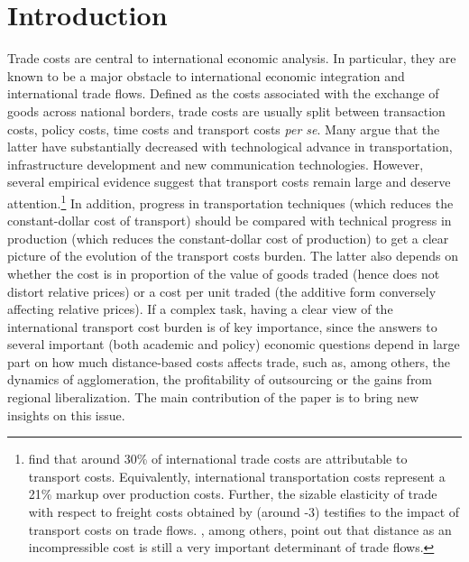 \documentclass[a4paper,11pt]{article}
\begin{document}
{\normalsize \vspace{0cm} }

{\normalsize \titlepage }

{\normalsize \newpage }


\section{Introduction \label{sec:Intro}}


Trade costs are central to international economic analysis. In particular, they are
known to be a major obstacle to international economic integration and international trade
flows. Defined as the costs associated with the exchange of goods across
national borders, trade costs are usually split between transaction costs, policy costs, time costs and transport costs \textit{per se}. Many argue that the latter have substantially
decreased with technological advance in transportation, infrastructure development
and new communication technologies. However, several empirical evidence
suggest that transport costs remain large and deserve attention.\footnote{\cite{anderson_wincoop_jel} find that around 30\% of international trade costs are attributable to transport costs. Equivalently, international transportation costs represent a 21\% markup over production costs. Further, the sizable elasticity of trade with respect to freight costs obtained by \cite{Behar_Venables} (around -3) testifies to the impact of transport costs on trade flows. \cite{Disdier_Head08}, among others, point out that distance as an incompressible cost is still a very important determinant of trade flows.} In addition, progress in transportation techniques (which reduces the constant-dollar cost of transport) should be compared with technical progress in production (which reduces the constant-dollar cost of production) to get a clear picture of the evolution
of the transport costs burden. The latter also depends on whether the cost is in proportion of the value of goods traded (hence does not distort relative prices) or a cost per unit traded (the additive form conversely affecting relative prices). If a complex task, having a clear view of the international transport cost burden is of key importance, since the answers to several important (both academic and policy) economic questions depend in large part on how much distance-based costs affects trade, such as, among others, the dynamics
of agglomeration, the profitability of outsourcing or the gains from regional liberalization. The main contribution of the paper is to bring new insights on this issue.\smallskip
\end{document}
